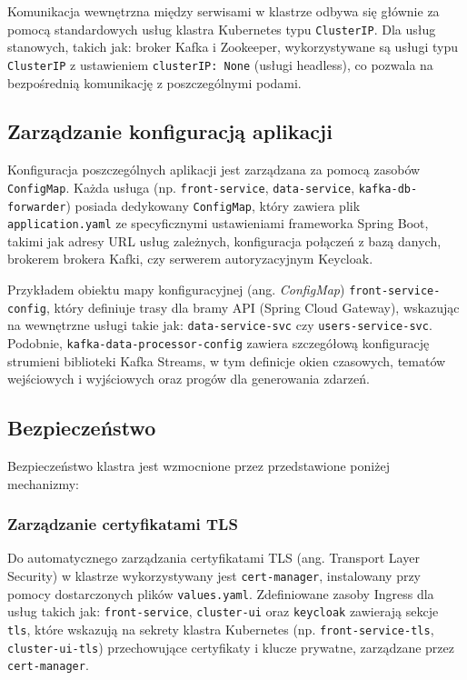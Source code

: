 Komunikacja wewnętrzna między serwisami w klastrze odbywa się głównie za pomocą standardowych usług klastra Kubernetes typu \texttt{ClusterIP}. Dla usług stanowych, takich jak: broker Kafka i Zookeeper, wykorzystywane są usługi typu \texttt{ClusterIP} z ustawieniem \texttt{clusterIP: None} (usługi headless), co pozwala na bezpośrednią komunikację z poszczególnymi podami.

\subsection{Zarządzanie konfiguracją aplikacji} 

Konfiguracja poszczególnych aplikacji jest zarządzana za pomocą zasobów \texttt{ConfigMap}. Każda usługa (np. \texttt{front-service}, \texttt{data-service}, \texttt{kafka-db-forwarder}) posiada dedykowany \texttt{ConfigMap}, który zawiera plik \texttt{application.yaml} ze specyficznymi ustawieniami frameworka Spring Boot, takimi jak adresy URL usług zależnych, konfiguracja połączeń z bazą danych, brokerem brokera Kafki, czy serwerem autoryzacyjnym Keycloak.

Przykładem obiektu mapy konfiguracyjnej (ang. \textit{ConfigMap}) \texttt{front-service-config}, który definiuje trasy dla bramy API (Spring Cloud Gateway), wskazując na wewnętrzne usługi takie jak: \texttt{data-service-svc} czy \texttt{users-service-svc}. Podobnie, \texttt{kafka-data-processor-config} zawiera szczegółową konfigurację strumieni biblioteki Kafka Streams, w tym definicje okien czasowych, tematów wejściowych i wyjściowych oraz progów dla generowania zdarzeń.

\subsection{Bezpieczeństwo}

Bezpieczeństwo klastra jest wzmocnione przez przedstawione poniżej mechanizmy:

\subsubsection{Zarządzanie certyfikatami TLS}
Do automatycznego zarządzania certyfikatami TLS (ang. Transport Layer Security) w klastrze wykorzystywany jest \texttt{cert-manager}, instalowany przy pomocy dostarczonych plików \texttt{values.yaml}. Zdefiniowane zasoby Ingress dla usług takich jak: \texttt{front-service}, \texttt{cluster-ui} oraz \texttt{keycloak} zawierają sekcje \texttt{tls}, które wskazują na sekrety klastra Kubernetes (np. \texttt{front-service-tls}, \texttt{cluster-ui-tls}) przechowujące certyfikaty i klucze prywatne, zarządzane przez \texttt{cert-manager}.

